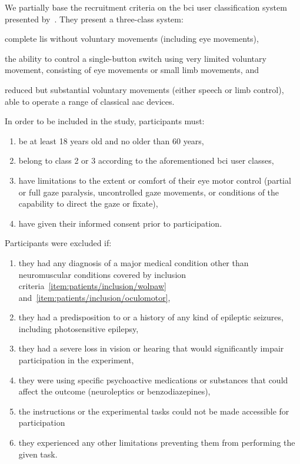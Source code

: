 \documentclass{article}
\begin{document}
We partially base the recruitment criteria on the \ac{bci} user classification system
presented by~\textcite{Wolpaw2006}.
They present a three-class system:
\begin{enumerate*}[label={(\arabic*)}]
	\item complete \ac{lis} without voluntary movements (including eye movements),
	\item the ability to control a single-button switch using very limited voluntary
	      movement, consisting of eye movements or small limb movements, and
	\item reduced but substantial voluntary movements (either speech or
	      limb control), able to operate a range of classical \ac{aac} devices.
\end{enumerate*}

\noindent In order to be included in the study, participants must:
\begin{enumerate}
	\item be at least 18 years old and no older than 60
	      years,
	\item belong to class 2 or 3 according to the aforementioned \ac{bci} user classes,
	      \label{item:patients/inclusion/wolpaw}
	\item have limitations to the extent or comfort of their eye motor control
	      (partial or full gaze paralysis, uncontrolled gaze movements, or
	      conditions of the capability to direct the gaze or fixate),%
	      \label{item:patients/inclusion/oculomotor}
	\item have given their informed consent prior to participation.
\end{enumerate}
Participants were excluded if:
\begin{enumerate}
	\item they had any diagnosis of a major medical condition other than neuromuscular
	      conditions covered by inclusion criteria~\ref{item:patients/inclusion/wolpaw}
	      and~\ref{item:patients/inclusion/oculomotor}\label{item:patients/exclusion/medical},%
	\item they had a predisposition to or a history of any kind of epileptic seizures,
	      including photosensitive epilepsy,\label{item:patients/exclusion/epilepsy}
	\item they had a severe loss in vision or hearing that would significantly impair
	      participation in the experiment,\label{item:patients/exclusion/vision}
	\item they were using specific psychoactive medications or substances that
	      could affect the outcome (neuroleptics or benzodiazepines),%
	      \label{item:patients/exclusion/cognitive}
	\item the instructions or the experimental tasks could not be made accessible for participation
	\item they experienced any other limitations preventing them from performing the given task.
\end{enumerate}
\end{document}
